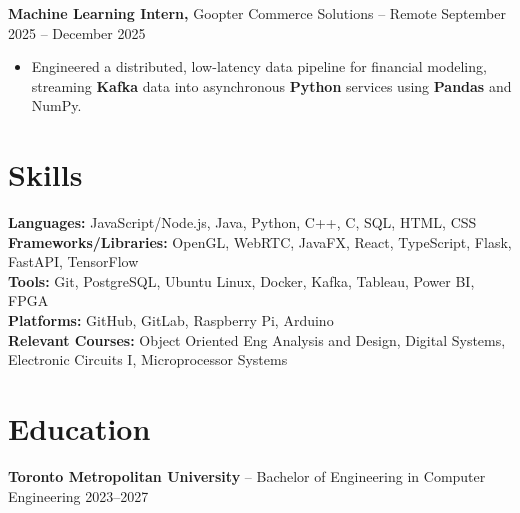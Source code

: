 \documentclass[11pt]{article}
\begin{document}
\smallskip
\textbf{Machine Learning Intern,} {Goopter Commerce Solutions} -- Remote \hfill September 2025 -- December 2025 \\
\begin{itemize}
  \item Engineered a distributed, low-latency data pipeline for financial modeling, streaming \textbf{Kafka} data into asynchronous \textbf{Python} services using \textbf{Pandas} and NumPy.
\end{itemize}

\section*{Skills}
\textbf{Languages:} JavaScript/Node.js, Java, Python, C++, C, SQL, HTML, CSS \\
\textbf{Frameworks/Libraries:} OpenGL, WebRTC, JavaFX, React, TypeScript, Flask, FastAPI, TensorFlow \\
\textbf{Tools:} Git, PostgreSQL, Ubuntu Linux, Docker, Kafka, Tableau, Power BI, FPGA \\
\textbf{Platforms:} GitHub, GitLab, Raspberry Pi, Arduino \\
\textbf{Relevant Courses:} Object Oriented Eng Analysis and Design, Digital Systems, Electronic Circuits I, Microprocessor Systems

\section*{Education}
\textbf{Toronto Metropolitan University} -- Bachelor of Engineering in Computer Engineering \hfill 2023--2027
\end{document}
